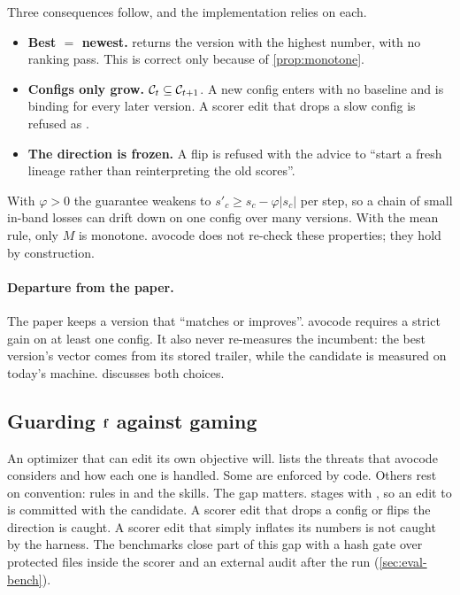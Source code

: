 Three consequences follow, and the implementation relies on each.
\begin{itemize}[leftmargin=*,itemsep=1pt]
  \item \textbf{Best $=$ newest.}  returns the version with the highest number, with no
    ranking pass. This is correct only because of \cref{prop:monotone}.
  \item \textbf{Configs only grow.} $\mathcal{C}_t \subseteq \mathcal{C}_{t+1}$. A new config enters with no
    baseline and is binding for every later version. A scorer edit that drops a slow config is
    refused as .
  \item \textbf{The direction is frozen.} A flip is refused with the advice to ``start a fresh
    lineage rather than reinterpreting the old scores''.
\end{itemize}
With $\varphi > 0$ the guarantee weakens to $s'_c \geq s_c - \varphi|s_c|$ per step, so a chain of
small in-band losses can drift down on one config over many versions. With the mean rule, only $M$
is monotone. avocode does not re-check these properties; they hold by construction.

\paragraph{Departure from the paper.} The paper keeps a version that ``matches or improves''.
avocode requires a strict gain on at least one config. It also never re-measures the incumbent: the
best version's vector comes from its stored trailer, while the candidate is measured on today's
machine.  discusses both choices.

\subsection{Guarding \texorpdfstring{$\mathbf{f}$}{f} against gaming}
\label{sec:gaming}

An optimizer that can edit its own objective will.  lists the threats that
avocode considers and how each one is handled. Some are enforced by code. Others rest on
convention: rules in  and the skills. The gap matters.  stages with
, so an edit to  is committed with the candidate. A scorer edit that
drops a config or flips the direction is caught. A scorer edit that simply inflates its numbers is
not caught by the harness. The benchmarks close part of this gap with a hash gate over protected
files inside the scorer and an external audit after the run (\cref{sec:eval-bench}).


